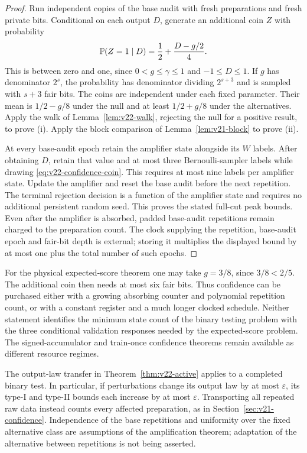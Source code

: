 \begin{proof}
Run independent copies of the base audit with fresh preparations and
fresh private bits. Conditional on each output $D$, generate an
additional coin $Z$ with probability
\begin{equation}\label{eq:v22-confidence-coin}
 \mathbb P(Z=1\mid D)=\frac12+\frac{D-g/2}{4}.
\end{equation}
This is between zero and one, since $0<g\le\gamma\le1$ and
$-1\le D\le1$. If $g$ has denominator $2^s$, the probability has
denominator dividing $2^{s+3}$ and is sampled with $s+3$ fair bits.
The coins are independent under each fixed parameter. Their mean is
$1/2-g/8$ under the null and at least $1/2+g/8$ under the alternatives.
Apply the walk of Lemma~\ref{lem:v22-walk}, rejecting the null for a
positive result, to prove (i). Apply the block comparison of
Lemma~\ref{lem:v21-block} to prove (ii).

At every base-audit epoch retain the amplifier state alongside its $W$
labels. After obtaining $D$, retain that value and at most three
Bernoulli-sampler labels while drawing \eqref{eq:v22-confidence-coin}.
This requires at most nine labels per amplifier state. Update the
amplifier and reset the base audit before the next repetition. The
terminal rejection decision is a function of the amplifier state and
requires no additional persistent random seed. This proves the stated
full-cut peak bounds. Even after the amplifier is absorbed, padded
base-audit repetitions remain charged to the preparation count. The
clock supplying the repetition, base-audit epoch and fair-bit depth is
external; storing it multiplies the displayed bound by at most one
plus the total number of such epochs.
\end{proof}

For the physical expected-score theorem one may take $g=3/8$, since
$3/8<2/5$. The additional coin then needs at most six fair bits.
Thus confidence can be purchased either with a growing absorbing
counter and polynomial repetition count, or with a constant register
and a much longer clocked schedule. Neither statement identifies the
minimum state count of the binary testing problem with the three
conditional validation responses needed by the expected-score problem.
The signed-accumulator and train-once confidence theorems remain
available as different resource regimes.

The output-law transfer in Theorem~\ref{thm:v22-active} applies to a
completed binary test. In particular, if perturbations change its
output law by at most $\varepsilon$, its type-I and type-II bounds each
increase by at most $\varepsilon$. Transporting all repeated raw data
instead counts every affected preparation, as in
Section~\ref{sec:v21-confidence}. Independence of the base repetitions
and uniformity over the fixed alternative class are assumptions of the
amplification theorem; adaptation of the alternative between repetitions
is not being asserted.
